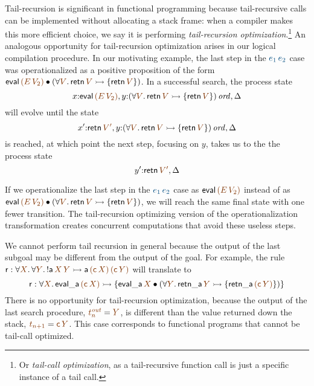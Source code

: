 Tail-recursion is significant in functional programming because
tail-recursive calls can be implemented without allocating a stack
frame: when a compiler makes this more efficient choice, we say it is
performing {\it tail-recursion optimization}.\footnote{Or {\it tail-call optimization}, as a tail-recursive function call is just a
  specific instance of a tail call.} An analogous opportunity for
tail-recursion optimization arises in our logical compilation
procedure. In our motivating example, the last step in the $\obj{e_1\,e_2}$
case was operationalized as a positive proposition of the form ${\sf
  eval}\,\lf{(E\, V_2)} \fuse (\forall \lf{V}.\,{\sf retn}\,\lf{V} \lefti \{ {\sf
  retn}\,\lf{V} \})$. In a successful search, the process state 
\[ x{:}{\sf
  eval}\,\lf{(E\, V_2)}, y{:}\istrue{(\forall \lf{V}.\,{\sf retn}\,\lf{V} \lefti \{
  {\sf retn}\,\lf{V} \})}, \Delta\]
will evolve until the
state 
\[ x'{:}{\sf retn}\,\lf{V'}, y{:}\istrue{(\forall \lf{V}.\,{\sf retn}\,\lf{V} \lefti
  \{ {\sf retn}\,\lf{V} \})}, \Delta\] is reached, at which point the next
step, focusing on $y$, takes us to the the process state \[y'{:}{\sf retn}\,\lf{V'}, \Delta\] 

If we operationalize the last step in the $\obj{e_1\,e_2}$ case as ${\sf
  eval}\,\lf{(E\,V_2)}$ instead of as ${\sf eval}\,\lf{(E\, V_2)} \fuse (\forall
\lf{V}.\,{\sf retn}\,\lf{V} \lefti \{ {\sf retn}\,\lf{V} \})$, we will reach the same
final state with one fewer transition. The tail-recursion optimizing
version of the operationalization transformation creates concurrent
computations that avoid these useless steps.

We cannot perform tail recursion in general because the output of the
last subgoal may be different from the output of the goal. For example,
the rule ${\sf r} : \forall\lf{X}.\,\forall\lf{Y}.\,{!}{\sf a}\,\lf{X}\,\lf{Y} \lefti
{\sf a}\,\lf{({\sf c}\,X)}\,\lf{({\sf c}\,Y)}$ will translate to
\[ {\sf r} : \forall\lf{X}.\,{\sf eval\_a}\,\lf{({\sf c}\,X)} \lefti \{ {\sf
  eval\_a}\,\lf{X} \fuse (\forall \lf{Y}.\, {\sf retn\_a}\,\lf{Y} \lefti \{ {\sf
  retn\_a}\,\lf{({\sf c}\,Y)} \} ) \} \] There is no opportunity for
tail-recursion optimization, because the output of the last search
procedure, $\lf{t^{\it out}_n} = \lf{Y}$, is different than the value returned
down the stack, $\lf{t_{n+1}} = \lf{{\sf c}\,Y}$. This case corresponds to
functional programs that cannot be tail-call optimized.

